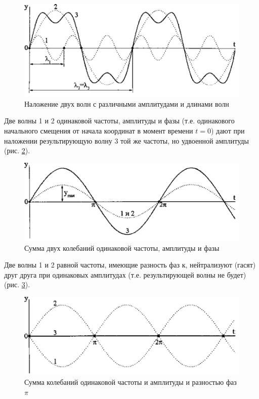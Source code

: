 \documentclass[oneside, final, 14pt]{extreport}
\begin{document}
\begin{figure}[h]
\centering
\includegraphics{pic-interferention-01}
\caption{Наложение двух волн с различными амплитудами и длинами волн}
\label{pic_interferention_01}
\end{figure}

Две волны 1 и 2 одинаковой частоты, амплитуды и фазы (т.е. одинакового начального смещения от начала координат в момент времени \(t=0\)) дают при наложении результирующую волну 3 той же частоты, но удвоенной амплитуды (рис. \ref{pic_interferention_02}).

\begin{figure}[h]
\centering
\includegraphics{pic-interferention-02}
\caption{Сумма двух колебаний одинаковой частоты, амплитуды и фазы}
\label{pic_interferention_02}
\end{figure}

Две волны 1 и 2 равной частоты, имеющие разность фаз к, нейтрализуют (гасят) друг друга при одинаковых амплитудах (т.е. результирующей волны не будет) (рис. \ref{pic_interferention_03}).

\begin{figure}[h]
\centering
\includegraphics{pic-interferention-03}
\caption{Сумма колебаний одинаковой частоты и амплитуды и разностью фаз \(\pi\)}
\label{pic_interferention_03}
\end{figure}
\end{document}
